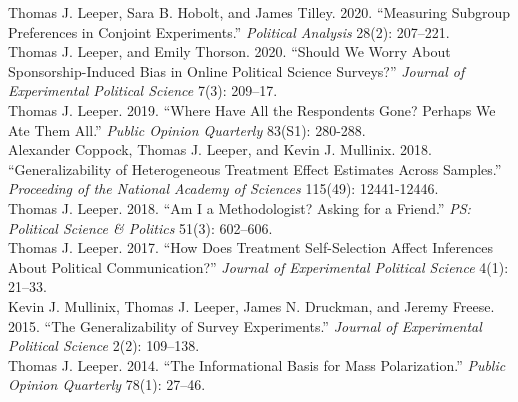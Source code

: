 \documentclass[12pt]{article}
\newcommand{\entry}[1]{\indent {\color{lg}\guillemotright}\hspace{2pt}#1\vspace{.25em}\\}
\begin{document}
	\entry{Thomas J. Leeper, Sara B. Hobolt, and James Tilley. 2020. ``Measuring Subgroup Preferences in Conjoint Experiments.'' \textit{Political Analysis} 28(2): 207--221.}
	\entry{Thomas J. Leeper, and Emily Thorson. 2020. ``Should We Worry About Sponsorship-Induced Bias in Online Political Science Surveys?'' \textit{Journal of Experimental Political Science} 7(3): 209--17.}
	\entry{Thomas J. Leeper. 2019. ``Where Have All the Respondents Gone? Perhaps We Ate Them All.'' \textit{Public Opinion Quarterly} 83(S1): 280-288.}
	\entry{Alexander Coppock, Thomas J. Leeper, and Kevin J. Mullinix. 2018. ``Generalizability of Heterogeneous Treatment Effect Estimates Across Samples.'' \textit{Proceeding of the National Academy of Sciences} 115(49): 12441-12446.}
	\entry{Thomas J. Leeper. 2018. ``Am I a Methodologist? Asking for a Friend.'' \textit{PS: Political Science \& Politics} 51(3): 602--606.}
    \entry{Thomas J. Leeper. 2017. ``How Does Treatment Self-Selection Affect Inferences About Political Communication?'' \textit{Journal of Experimental Political Science} 4(1): 21--33.}	
	\entry{Kevin J. Mullinix, Thomas J. Leeper, James N. Druckman, and Jeremy Freese. 2015. ``The Generalizability of Survey Experiments.'' {\em Journal of Experimental Political Science} 2(2): 109--138.}
	\entry{Thomas J. Leeper. 2014. ``The Informational Basis for Mass Polarization.'' {\em Public Opinion Quarterly} 78(1): 27--46.}
\end{document}
